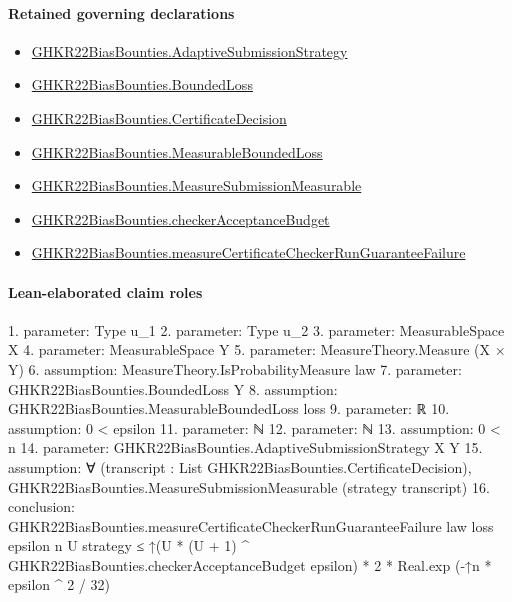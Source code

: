 \documentclass[10pt]{article}
\begin{document}
\paragraph{Retained governing declarations}
\begin{itemize}\raggedright
\item \hyperlink{governing-declaration-28f1bb71fd1d4b66}{GHKR22\allowbreak{}Bias\allowbreak{}Bounties.\allowbreak{}Adaptive\allowbreak{}Submission\allowbreak{}Strategy}
\item \hyperlink{paper-prerequisite-ef6c319b0770dad4}{GHKR22\allowbreak{}Bias\allowbreak{}Bounties.\allowbreak{}Bounded\allowbreak{}Loss}
\item \hyperlink{governing-declaration-7881732e3fc3c15e}{GHKR22\allowbreak{}Bias\allowbreak{}Bounties.\allowbreak{}Certificate\allowbreak{}Decision}
\item \hyperlink{governing-declaration-56b96e1cde76e3f7}{GHKR22\allowbreak{}Bias\allowbreak{}Bounties.\allowbreak{}Measurable\allowbreak{}Bounded\allowbreak{}Loss}
\item \hyperlink{governing-declaration-06764dde54db369e}{GHKR22\allowbreak{}Bias\allowbreak{}Bounties.\allowbreak{}Measure\allowbreak{}Submission\allowbreak{}Measurable}
\item \hyperlink{paper-prerequisite-3296eacfe5745d61}{GHKR22\allowbreak{}Bias\allowbreak{}Bounties.\allowbreak{}checker\allowbreak{}Acceptance\allowbreak{}Budget}
\item \hyperlink{governing-declaration-b0bcbba8b37a3398}{GHKR22\allowbreak{}Bias\allowbreak{}Bounties.\allowbreak{}measure\allowbreak{}Certificate\allowbreak{}Checker\allowbreak{}Run\allowbreak{}Guarantee\allowbreak{}Failure}
\end{itemize}
\paragraph{Lean-elaborated claim roles}\begin{ReviewVerbatim}
1. parameter: Type u_1
2. parameter: Type u_2
3. parameter: MeasurableSpace X
4. parameter: MeasurableSpace Y
5. parameter: MeasureTheory.Measure (X × Y)
6. assumption: MeasureTheory.IsProbabilityMeasure law
7. parameter: GHKR22BiasBounties.BoundedLoss Y
8. assumption: GHKR22BiasBounties.MeasurableBoundedLoss loss
9. parameter: ℝ
10. assumption: 0 < epsilon
11. parameter: ℕ
12. parameter: ℕ
13. assumption: 0 < n
14. parameter: GHKR22BiasBounties.AdaptiveSubmissionStrategy X Y
15. assumption: ∀ (transcript : List GHKR22BiasBounties.CertificateDecision),
  GHKR22BiasBounties.MeasureSubmissionMeasurable (strategy transcript)
16. conclusion: GHKR22BiasBounties.measureCertificateCheckerRunGuaranteeFailure law loss epsilon n U strategy ≤
  ↑(U * (U + 1) ^ GHKR22BiasBounties.checkerAcceptanceBudget epsilon) * 2 * Real.exp (-↑n * epsilon ^ 2 / 32)
\end{ReviewVerbatim}
\end{document}
